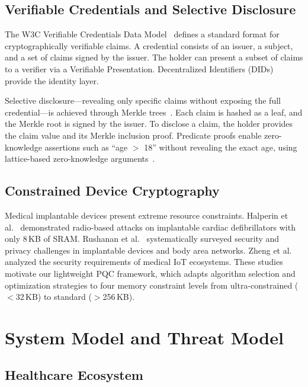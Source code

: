 \documentclass[conference,10pt]{IEEEtran}
\begin{document}
\subsection{Verifiable Credentials and Selective Disclosure}

The W3C Verifiable Credentials Data Model~\cite{w3cvc} defines a standard format for cryptographically verifiable claims. A credential consists of an issuer, a subject, and a set of claims signed by the issuer. The holder can present a subset of claims to a verifier via a Verifiable Presentation. Decentralized Identifiers (DIDs)~\cite{w3cdid} provide the identity layer.

Selective disclosure---revealing only specific claims without exposing the full credential---is achieved through Merkle trees~\cite{merkle1989}. Each claim is hashed as a leaf, and the Merkle root is signed by the issuer. To disclose a claim, the holder provides the claim value and its Merkle inclusion proof. Predicate proofs enable zero-knowledge assertions such as ``age $>$ 18'' without revealing the exact age, using lattice-based zero-knowledge arguments~\cite{bootle2016zkp, yang2022pqzkp}.

\subsection{Constrained Device Cryptography}

Medical implantable devices present extreme resource constraints. Halperin et al.~\cite{halperin2008icd} demonstrated radio-based attacks on implantable cardiac defibrillators with only 8\,KB of SRAM. Rushanan et al.~\cite{rushanan2014meddev} systematically surveyed security and privacy challenges in implantable devices and body area networks. Zheng et al.~\cite{zheng2017mediot} analyzed the security requirements of medical IoT ecosystems. These studies motivate our lightweight PQC framework, which adapts algorithm selection and optimization strategies to four memory constraint levels from ultra-constrained ($<$32\,KB) to standard ($>$256\,KB).

\section{System Model and Threat Model}
\label{sec:system_model}

\subsection{Healthcare Ecosystem}
\end{document}
